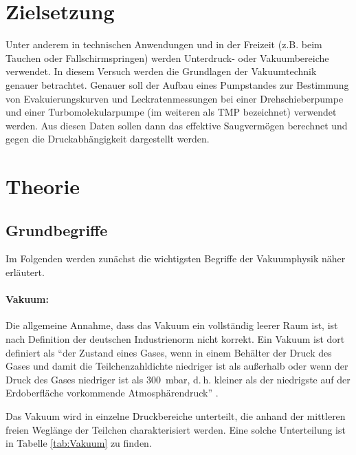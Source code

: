 \section{Zielsetzung}
\label{sec:Zielsetzung}
Unter anderem in technischen Anwendungen und in der Freizeit
(z.B. beim Tauchen oder Fallschirmspringen)
werden Unterdruck- oder Vakuumbereiche verwendet.
In diesem Versuch werden die Grundlagen der Vakuumtechnik genauer betrachtet.
Genauer soll der Aufbau eines Pumpstandes zur Bestimmung von Evakuierungskurven und Leckratenmessungen
bei einer Drehschieberpumpe und einer Turbomolekularpumpe (im weiteren als TMP bezeichnet) verwendet werden.
Aus diesen Daten sollen dann das effektive Saugvermögen berechnet und gegen die Druckabhängigkeit dargestellt werden.


\section{Theorie}
\label{sec:Theorie}
\subsection{Grundbegriffe}

Im Folgenden werden zunächst die wichtigsten Begriffe der Vakuumphysik näher erläutert.
\paragraph{Vakuum:}
Die allgemeine Annahme, dass das Vakuum ein vollständig leerer Raum ist, ist nach Definition der
deutschen Industrienorm nicht korrekt.
Ein Vakuum ist dort definiert als
\enquote{der Zustand eines Gases, wenn in einem Behälter der
Druck des Gases und damit die Teilchenzahldichte niedriger ist als außerhalb oder wenn der Druck
des Gases niedriger ist als \SI{300}{\milli\bar},
d. h. kleiner als der niedrigste auf der Erdoberfläche vorkommende Atmosphärendruck} \cite{vakuum}.

Das Vakuum wird in einzelne Druckbereiche unterteilt,
die anhand der mittleren freien Weglänge der Teilchen charakterisiert werden.
Eine solche Unterteilung ist in Tabelle \ref{tab:Vakuum} zu finden.

